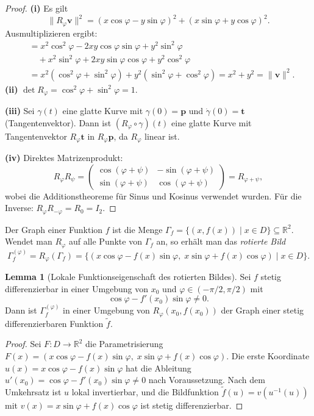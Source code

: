 ﻿\documentclass[12pt, a4paper]{article}
\theoremstyle{definition}
\newtheorem{lemma}{Lemma}[section]
\begin{document}
	\begin{proof}
		\textbf{(i)} Es gilt
		\[
		\|R_\varphi \mathbf{v}\|^2
		= (x\cos\varphi - y\sin\varphi)^2 + (x\sin\varphi + y\cos\varphi)^2.
		\]
		Ausmultiplizieren ergibt:
		\begin{align*}
			&= x^2\cos^2\varphi - 2xy\cos\varphi\sin\varphi + y^2\sin^2\varphi \\
			&\quad + x^2\sin^2\varphi + 2xy\sin\varphi\cos\varphi + y^2\cos^2\varphi \\
			&= x^2(\cos^2\varphi + \sin^2\varphi) + y^2(\sin^2\varphi + \cos^2\varphi)
			= x^2 + y^2 = \|\mathbf{v}\|^2.
		\end{align*}
		\textbf{(ii)} $\det R_\varphi = \cos^2\varphi + \sin^2\varphi = 1$.
		
		\textbf{(iii)} Sei $\gamma(t)$ eine glatte Kurve mit $\gamma(0) = \mathbf{p}$ und
		$\dot\gamma(0) = \mathbf{t}$ (Tangentenvektor). Dann ist $(R_\varphi \circ \gamma)(t)$
		eine glatte Kurve mit Tangentenvektor $R_\varphi \mathbf{t}$ in $R_\varphi \mathbf{p}$,
		da $R_\varphi$ linear ist.
		
		\textbf{(iv)} Direktes Matrizenprodukt:
		\[
		R_\varphi R_\psi = \begin{pmatrix} \cos(\varphi+\psi) & -\sin(\varphi+\psi) \\
			\sin(\varphi+\psi) & \cos(\varphi+\psi) \end{pmatrix} = R_{\varphi+\psi},
		\]
		wobei die Additionstheoreme für Sinus und Kosinus verwendet wurden.
		Für die Inverse: $R_\varphi R_{-\varphi} = R_0 = I_2$.
	\end{proof}
	
	Der Graph einer Funktion $f$ ist die Menge
	$\Gamma_f = \{(x, f(x)) \mid x \in D\} \subseteq \mathbb{R}^2$.
	Wendet man $R_\varphi$ auf alle Punkte von $\Gamma_f$ an, so erhält man
	das \emph{rotierte Bild}
	\[
	\Gamma_f^{(\varphi)} = R_\varphi(\Gamma_f)
	= \bigl\{(x\cos\varphi - f(x)\sin\varphi,\; x\sin\varphi + f(x)\cos\varphi)
	\mid x \in D\bigr\}.
	\]
	
	\begin{lemma}[Lokale Funktionseigenschaft des rotierten Bildes]
		\label{lem:lokal}
		Sei $f$ stetig differenzierbar in einer Umgebung von $x_0$ und
		$\varphi \in (-\pi/2, \pi/2)$ mit
		\[
		\cos\varphi - f'(x_0)\sin\varphi \neq 0.
		\]
		Dann ist $\Gamma_f^{(\varphi)}$ in einer Umgebung von
		$R_\varphi(x_0, f(x_0))$ der Graph einer stetig differenzierbaren
		Funktion $\tilde{f}$.
	\end{lemma}
	
	\begin{proof}
		Sei $F: D \to \mathbb{R}^2$ die Parametrisierung
		$F(x) = (x\cos\varphi - f(x)\sin\varphi,\; x\sin\varphi + f(x)\cos\varphi)$.
		Die erste Koordinate $u(x) = x\cos\varphi - f(x)\sin\varphi$ hat die
		Ableitung $u'(x_0) = \cos\varphi - f'(x_0)\sin\varphi \neq 0$ nach Voraussetzung.
		Nach dem Umkehrsatz ist $u$ lokal invertierbar, und die Bildfunktion
		$\tilde{f}(u) = v(u^{-1}(u))$ mit $v(x) = x\sin\varphi + f(x)\cos\varphi$
		ist stetig differenzierbar.
	\end{proof}
	
\end{document}
